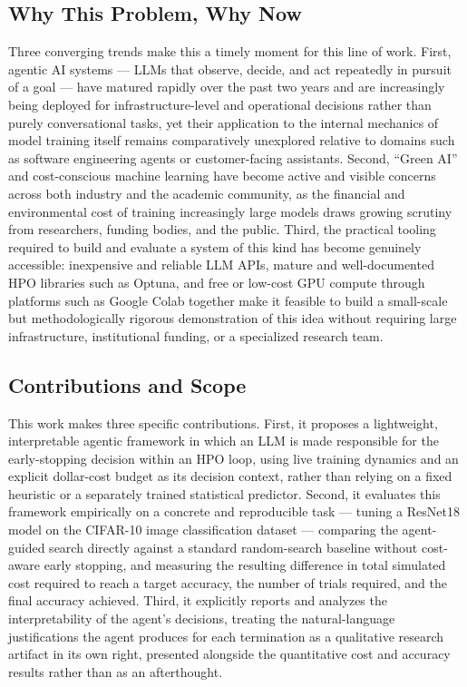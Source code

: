 \documentclass[11pt]{article}
\begin{document}
\subsection{Why This Problem, Why Now}

Three converging trends make this a timely moment for this line of work. First, agentic AI systems --- LLMs that observe, decide, and act repeatedly in pursuit of a goal --- have matured rapidly over the past two years and are increasingly being deployed for infrastructure-level and operational decisions rather than purely conversational tasks, yet their application to the internal mechanics of model training itself remains comparatively unexplored relative to domains such as software engineering agents or customer-facing assistants. Second, ``Green AI'' and cost-conscious machine learning have become active and visible concerns across both industry and the academic community, as the financial and environmental cost of training increasingly large models draws growing scrutiny from researchers, funding bodies, and the public. Third, the practical tooling required to build and evaluate a system of this kind has become genuinely accessible: inexpensive and reliable LLM APIs, mature and well-documented HPO libraries such as Optuna, and free or low-cost GPU compute through platforms such as Google Colab together make it feasible to build a small-scale but methodologically rigorous demonstration of this idea without requiring large infrastructure, institutional funding, or a specialized research team.

\subsection{Contributions and Scope}

This work makes three specific contributions. First, it proposes a lightweight, interpretable agentic framework in which an LLM is made responsible for the early-stopping decision within an HPO loop, using live training dynamics and an explicit dollar-cost budget as its decision context, rather than relying on a fixed heuristic or a separately trained statistical predictor. Second, it evaluates this framework empirically on a concrete and reproducible task --- tuning a ResNet18 model on the CIFAR-10 image classification dataset --- comparing the agent-guided search directly against a standard random-search baseline without cost-aware early stopping, and measuring the resulting difference in total simulated cost required to reach a target accuracy, the number of trials required, and the final accuracy achieved. Third, it explicitly reports and analyzes the interpretability of the agent's decisions, treating the natural-language justifications the agent produces for each termination as a qualitative research artifact in its own right, presented alongside the quantitative cost and accuracy results rather than as an afterthought.
\end{document}
